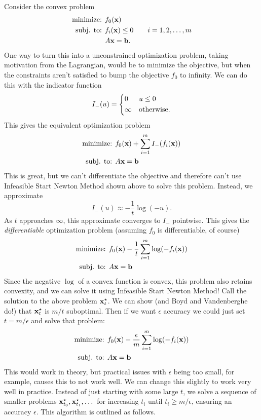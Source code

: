 \documentclass[12pt,letterpaper]{article}
\begin{document}
Consider the convex problem
\begin{align*}
    \text{minimize: } & f_0({\bf x})\\
    \text{subj. to: } & f_i({\bf x}) \leq 0 \qquad i = 1,2,\dots,m\\
                      & A{\bf x} = {\bf b}.
\end{align*}
One way to turn this into a unconstrained optimization problem, taking motivation from the Lagrangian,
would be to minimize the objective, but when the constraints aren't satisfied to bump the objective
$f_0$ to infinity. We can do this with the indicator function
\[
I_-(u) = \begin{cases*}0 & $u \leq 0$\\ \infty & otherwise.\end{cases*}
\]
This gives the equivalent optimization problem
\begin{align*}
    \text{minimize: } & f_0({\bf x}) + \sum_{i=1}^m I_-(f_i({\bf x}))\\
    \text{subj. to: } & A{\bf x} = {\bf b}
\end{align*}
This is great, but we can't differentiate the objective and therefore can't use Infeasible Start Newton Method
shown above to solve this problem. Instead, we approximate
\[
    I_-(u) \approx -\frac{1}{t}\log(-u).
\]
As $t$ approaches $\infty$, this approximate converges to $I_-$ pointwise. This gives the
\textit{differentiable} optimization problem (assuming $f_0$ is differentiable, of course)
\begin{align*}
    \text{minimize: } & f_0({\bf x}) - \frac{1}{t}\sum_{i=1}^m \log(-f_i({\bf x}))\\
    \text{subj. to: } & A{\bf x} = {\bf b}
\end{align*}
Since the negative $\log$ of a convex function is convex, this problem also retains convexity, and we can
solve it using Infeasible Start Newton Method! Call the solution to the above problem ${\bf x}_t^\star$. We can
show (and Boyd and Vandenberghe do!) that ${\bf x}_t^\star$ is $m/t$ suboptimal. Then if we want $\epsilon$ accuracy
we could just set $t = m/\epsilon$ and solve that problem:
\begin{align*}
    \text{minimize: } & f_0({\bf x}) - \frac{\epsilon}{m}\sum_{i=1}^m \log(-f_i({\bf x}))\\
    \text{subj. to: } & A{\bf x} = {\bf b}
\end{align*}
This would work in theory, but practical issues with $\epsilon$ being too small, for example, causes this to not work
well. We can change this slightly to work very well in practice. Instead of just starting with some large $t$,
we solve a sequence of smaller problems ${\bf x}_{t_0}^\star,{\bf x}_{t_1}^\star,\dots$ for increasing $t_i$ until
$t_i \geq m/\epsilon$, ensuring an accuracy $\epsilon$. This algorithm is outlined as follows.
\end{document}

